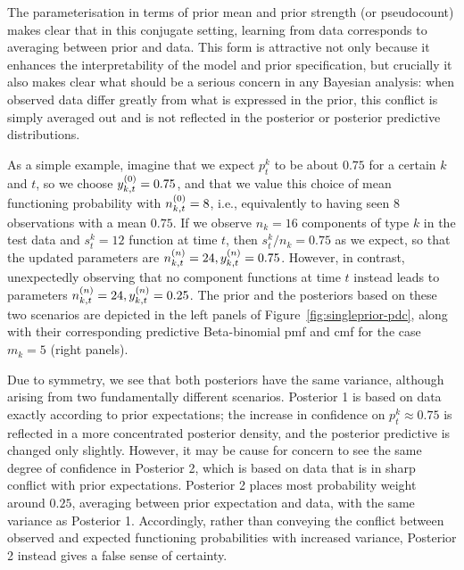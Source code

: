 \documentclass[12pt, a4paper]{elsarticle}
\newcommand{\ptk}{p^k_t}
\begin{document}
The parameterisation in terms of prior mean and prior strength (or pseudocount)
makes clear that in this conjugate setting,
learning from data corresponds to averaging between prior and data.
This form is attractive not only because it enhances the interpretability of the model and prior specification,
but crucially it also makes clear what should be a serious concern in any Bayesian analysis:
when observed data differ greatly from what is expressed in the prior,
this conflict is simply averaged out
and is not reflected in the posterior or posterior predictive distributions.

As a simple example, imagine that we expect $\ptk$ to be about $0.75$ for a certain $k$ and $t$,
so we choose $y^{(0)}_{k,t} = 0.75$,
and that we value this choice of mean functioning probability with $n^{(0)}_{k,t} = 8$,
i.e., equivalently to having seen $8$ observations with a mean $0.75$.
If we observe $n_k = 16$ components of type $k$ in the test data and $s^k_t = 12$ function at time $t$,
then $s^k_t/n_k = 0.75$ as we expect,
so that the updated parameters are $n^{(n)}_{k,t} = 24, y^{(n)}_{k,t}=0.75$.
However, in contrast, unexpectedly observing that no component functions at time $t$ instead
leads to parameters $n^{(n)}_{k,t} = 24, y^{(n)}_{k,t}=0.25$.
The prior and the posteriors based on these two scenarios
are depicted in the left panels of Figure~\ref{fig:singleprior-pdc},
along with their corresponding predictive Beta-binomial pmf and cmf
for the case $m_k = 5$ (right panels).

Due to symmetry, we see that both posteriors have the same variance,
although arising from two fundamentally different scenarios.
Posterior 1 is based on data exactly according to prior expectations;
the increase in confidence on $\ptk \approx 0.75$
is reflected in a more concentrated posterior density,
and the posterior predictive is changed only slightly.
However, it may be cause for concern to see the same degree of confidence in Posterior 2,
which is based on data that is in sharp conflict with prior expectations.
Posterior 2 places most probability weight around $0.25$,
averaging between prior expectation and data,
with the same variance as Posterior 1.
Accordingly, rather than conveying the conflict between observed
and expected functioning probabilities with increased variance,
Posterior 2 instead gives a false sense of certainty.
\end{document}
